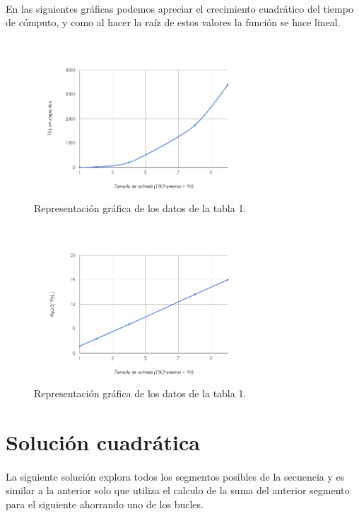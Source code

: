 \documentclass[es]{ifirak}
\begin{document}
\paragraph{}
En las siguientes gráficas podemos apreciar el crecimiento cuadrático del tiempo de cómputo, y como al hacer la raíz de estos valores la función se hace lineal.
\begin{figure}[htbp]
	\centering
	\includegraphics[width=0.8\textwidth]{cubica.png}
	\caption{Representación gráfica de los datos de la tabla 1.}\label{figure}
\end{figure}

\begin{figure}[htbp]
	\centering
	\includegraphics[width=0.8\textwidth]{raiz3.png}
	\caption{Representación gráfica de los datos de la tabla 1.}\label{figure}
\end{figure}
\newpage
\section{Solución cuadrática}
\paragraph{}
La siguiente solución explora todos los segmentos posibles de la secuencia y es similar a la anterior solo que utiliza el calculo de la suma del anterior segmento para el siguiente ahorrando uno de los bucles.
\end{document}
